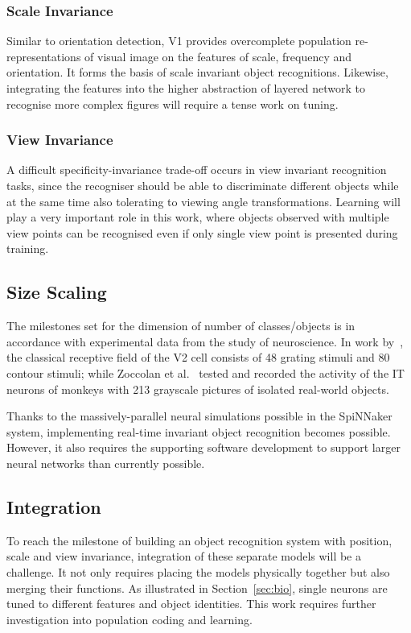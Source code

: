 \documentclass[journal]{journal}
\begin{document}
\subsubsection{Scale Invariance}
Similar to orientation detection, V1 provides overcomplete population re-representations of visual image on the features of scale, frequency and orientation.
It forms the basis of scale invariant object recognitions.
Likewise, integrating the features into the higher abstraction of layered network to recognise more complex figures will require a tense work on tuning.
\subsubsection{View Invariance}
A difficult specificity-invariance trade-off occurs in view invariant recognition tasks, since the recogniser should be able to discriminate different objects while at the same time also tolerating to viewing angle transformations.
Learning will play a very important role in this work, where objects observed with multiple view points can be recognised even if only single view point is presented during training.
\subsection{Size Scaling}
The milestones set for the dimension of number of classes/objects is in accordance with experimental data from the study of neuroscience.
In work by~\cite{hegde2004temporal}, the classical receptive field of the V2 cell consists of 48 grating stimuli and 80 contour stimuli; while Zoccolan et al.~\cite{zoccolan2007trade} tested and recorded the activity of the IT neurons of monkeys with 213 grayscale pictures of isolated real-world objects.

Thanks to the massively-parallel neural simulations possible in the SpiNNaker system, implementing real-time invariant object recognition becomes possible.
However, it also requires the supporting software development to support larger neural networks than currently possible.  
\subsection{Integration}
To reach the milestone of building an object recognition system with position, scale and view invariance, integration of these separate models will be a challenge.
It not only requires placing the models physically together but also merging their functions.
As illustrated in Section~\ref{sec:bio}, single neurons are tuned to different features and object identities.
This work requires further investigation into population coding and learning. 
\end{document}
